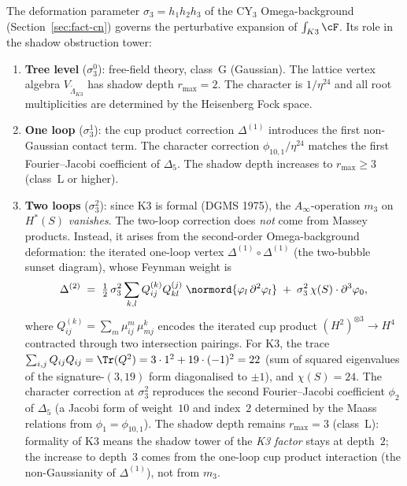 The deformation parameter $\sigma_3 = h_1 h_2 h_3$ of the
CY$_3$ Omega-background (Section~\ref{sec:fact-cn}) governs
the perturbative expansion of $\int_{K3} \cF$. Its role in
the shadow obstruction tower:

\begin{enumerate}[label=(\roman*)]
\item \textbf{Tree level} ($\sigma_3^0$): free-field theory,
 class~G (Gaussian). The lattice vertex algebra
 $V_{\widetilde{\Lambda}_{K3}}$ has shadow depth $r_{\max} = 2$.
 The character is $1/\eta^{24}$ and all root
 multiplicities are determined by the Heisenberg Fock space.

\item \textbf{One loop} ($\sigma_3^1$): the cup product
 correction $\Delta^{(1)}$ introduces the first non-Gaussian
 contact term. The character correction
 $\phi_{10,1}/\eta^{24}$ matches the first Fourier--Jacobi
 coefficient of $\Delta_5$. The shadow depth increases to
 $r_{\max} \geq 3$ (class~L or higher).

\item \textbf{Two loops} ($\sigma_3^2$): since K3 is formal
 (DGMS 1975), the $A_\infty$-operation $m_3$ on $H^*(S)$
 \emph{vanishes}. The two-loop correction does \emph{not}
 come from Massey products. Instead, it arises from the
 second-order Omega-background deformation: the iterated
 one-loop vertex $\Delta^{(1)} \circ \Delta^{(1)}$
 (the two-bubble sunset diagram), whose Feynman weight is
 \begin{equation}\label{eq:two-loop-vertex}
   \Delta^{(2)}
   \;=\;
   \tfrac{1}{2}\, \sigma_3^2
   \sum_{k,l} Q_{ij}^{(k)} Q_{kl}^{(j)}\;
   \normord{\varphi_l\, \partial^2\varphi_l}
   \;+\;
   \sigma_3^2\, \chi(S) \cdot \partial^3\varphi_0,
 \end{equation}
 where $Q_{ij}^{(k)} = \sum_m \mu^m_{ij}\,\mu^k_{mj}$
 encodes the iterated cup product $(H^2)^{\otimes 3} \to H^4$
 contracted through two intersection pairings.
 For K3, the trace
 $\sum_{i,j} Q_{ij} Q_{ij} = \Tr(Q^2) = 3 \cdot 1^2 + 19 \cdot (-1)^2 = 22$
 (sum of squared eigenvalues of the signature-$(3,19)$ form
 diagonalised to $\pm 1$), and $\chi(S) = 24$.
 The character correction at $\sigma_3^2$ reproduces
 the second Fourier--Jacobi coefficient $\phi_2$ of $\Delta_5$
 (a Jacobi form of weight~$10$ and index~$2$ determined by the
 Maass relations from $\phi_1 = \phi_{10,1}$).
 The shadow depth remains $r_{\max} = 3$ (class~L):
 formality of K3 means the shadow tower of the
 \emph{K3 factor} stays at depth~$2$; the increase to
 depth~$3$ comes from the one-loop cup product interaction
 (the non-Gaussianity of $\Delta^{(1)}$), not from $m_3$.


\end{enumerate}
